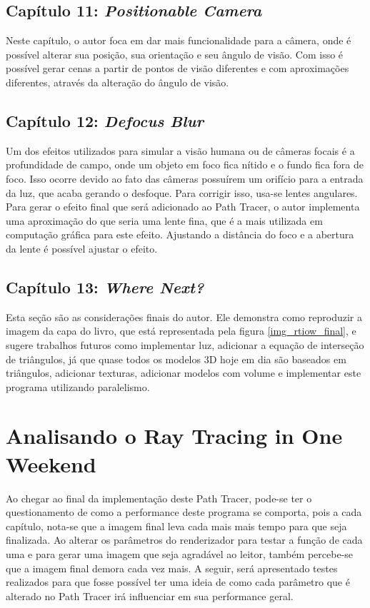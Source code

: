 \documentclass[journal]{IEEEtran}
\begin{document}
\subsection*{Capítulo 11: \emph{Positionable Camera}}
Neste capítulo, o autor foca em dar mais funcionalidade para a câmera, onde é possível alterar sua posição,
sua orientação e seu ângulo de visão. Com isso é possível gerar cenas a partir de pontos de visão diferentes
e com aproximações diferentes, através da alteração do ângulo de visão.

\subsection*{Capítulo 12: \emph{Defocus Blur}}
Um dos efeitos utilizados para simular a visão humana ou de câmeras focais é a profundidade de campo, onde
um objeto em foco fica nítido e o fundo fica fora de foco. Isso ocorre devido ao fato das câmeras possuírem
um orifício para a entrada da luz, que acaba gerando o desfoque. Para corrigir isso, usa-se lentes angulares.
Para gerar o efeito final que será adicionado ao Path Tracer, o autor implementa uma aproximação do que seria
uma lente fina, que é a mais utilizada em computação gráfica para este efeito. Ajustando a distância do foco
e a abertura da lente é possível ajustar o efeito.

\subsection*{Capítulo 13: \emph{Where Next?}}
Esta seção são as considerações finais do autor. Ele demonstra como reproduzir a imagem da capa do livro, que
está representada pela figura \ref{img_rtiow_final}, e sugere trabalhos futuros como implementar luz, adicionar
a equação de interseção de triângulos, já que quase todos os modelos 3D hoje em dia são baseados em triângulos,
adicionar texturas, adicionar modelos com volume e implementar este programa utilizando paralelismo.

\section{Analisando o Ray Tracing in One Weekend}
Ao chegar ao final da implementação deste Path Tracer, pode-se ter o questionamento de como a performance
deste programa se comporta, pois a cada capítulo, nota-se que a imagem final leva cada mais mais tempo para
que seja finalizada. Ao alterar os parâmetros do renderizador para testar a função de cada uma e para gerar
uma imagem que seja agradável ao leitor, também percebe-se que a imagem final demora cada vez mais. A seguir,
será apresentado testes realizados para que fosse possível ter uma ideia de como cada parâmetro que é alterado
no Path Tracer irá influenciar em sua performance geral.
\end{document}

